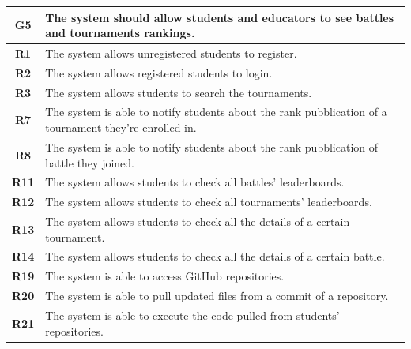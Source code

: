 \documentclass[12pt, a4paper]{report}
\begin{document}
    \begin{table}[H]
        \begin{tabularx}{\textwidth}{cX}
        \textbf{G5}   & The system should allow students and educators to see battles and tournaments rankings.                                         \\ \hline
        \textbf{R1}   & The system allows unregistered students to register.                                                                            \\
        \textbf{R2}   & The system allows registered students to login.                                                                                 \\
        \textbf{R3}   & The system allows students to search the tournaments.                                                                           \\
        \textbf{R7}   & The system is able to notify students about the rank pubblication of a tournament they're enrolled in.                          \\
        \textbf{R8}   & The system is able to notify students about the rank pubblication of battle they joined.                                        \\
        \textbf{R11}  & The system allows students to check all battles' leaderboards.                                                                  \\
        \textbf{R12}  & The system allows students to check all tournaments' leaderboards.                                                              \\
        \textbf{R13}  & The system allows students to check all the details of a certain tournament.                                                    \\
        \textbf{R14}  & The system allows students to check all the details of a certain battle.                                                        \\
        \textbf{R19}  & The system is able to access GitHub repositories.                                                                               \\
        \textbf{R20}  & The system is able to pull updated files from a commit of a repository.                                                         \\
        \textbf{R21}  & The system is able to execute the code pulled from students' repositories.                                                      \\

\end{tabularx}
\end{table}
\end{document}
